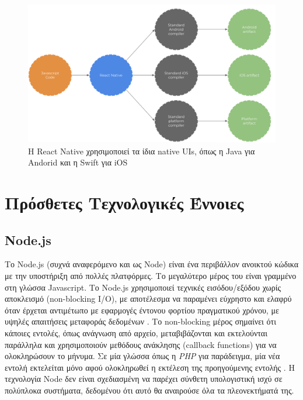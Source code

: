 \begin{figure}
    \centering
    \includegraphics[scale=0.2]{figures/react-native-bridge.png}
    \caption{Η React Native χρησιμοποιεί τα ίδια native UIs, όπως η Java για Andorid και η Swift για iOS}
    \label{reactnativebridge}
\end{figure}

\section{Πρόσθετες Τεχνολογικές Έννοιες}
\subsection{Node.js}

Το Node.js (συχνά αναφερόμενο και ως Node) είναι ένα περιβάλλον ανοικτού κώδικα με την υποστήριξη από πολλές πλατφόρμες. Το μεγαλύτερο μέρος του είναι γραμμένο στη γλώσσα Javascript. Το Node.js χρησιμοποιεί τεχνικές εισόδου/εξόδου χωρίς αποκλεισμό (non-blocking I/O), με αποτέλεσμα να παραμένει εύχρηστο και ελαφρύ όταν έρχεται αντιμέτωπο με εφαρμογές έντονου φορτίου πραγματικού χρόνου, με υψηλές απαιτήσεις μεταφοράς δεδομένων \cite{[NODE1]}. Το non-blocking μέρος σημαίνει ότι κάποιες εντολές, όπως ανάγνωση από αρχείο, μεταβιβάζονται και εκτελούνται παράλληλα και χρησιμοποιούν μεθόδους ανάκλησης (callback functions) για να ολοκληρώσουν το μήνυμα. Σε μία γλώσσα όπως η \textit{PHP} για παράδειγμα, μία νέα εντολή εκτελείται μόνο αφού ολοκληρωθεί η εκτέλεση της προηγούμενης εντολής \cite{[NODE2]}. Η τεχνολογία Node δεν είναι σχεδιασμένη να παρέχει σύνθετη υπολογιστική ισχύ σε πολύπλοκα συστήματα, δεδομένου ότι αυτό θα αναιρούσε όλα τα πλεονεκτήματά της.

